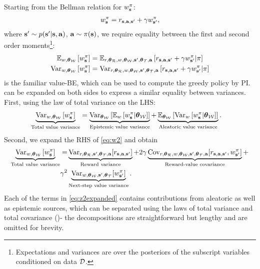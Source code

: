 \documentclass{article}
\begin{document}
\begin{appendices}
Starting from the Bellman relation for $\wb$:
\begin{align*}
\wb = \rsanb + \gamma \wnb,
\end{align*}
where $\bm{s}' \sim p(\ns | \s, \ac)$, $\ac \sim \pi(\s)$, we require equality between the first and second order moments\footnote{Expectations and variances are over the posteriors of the subscript variables conditioned on data $\data$.}:
\begin{align}
\E_{w, \thetamcw} \sqb{\wb} &= \E_{r, \thetamcr, w, \thetamcw, \ns, \thetamct, \ac} \sqb{\rsanb + \gamma \wnb | \pi} \label{eq:w1} \\
\Var_{w, \thetamcw} \sqb{\wb} &= \Var_{r, \thetamcr, w, \thetamcw, \ns, \thetamct, \ac} \sqb{\rsanb + \gamma \wnb | \pi} \label{eq:w2}
\end{align}
 is the familiar value-BE, which can be used to compute the greedy policy by PI.  can be expanded on both sides to express a similar equality between variances. First, using the law of total variance on the LHS:
\begin{align*}
\underbrace{\Var_{w, \thetamcw} \sqb{\wb}}_{\text{Total value variance}} &= \underbrace{\Var_{\thetamcw} \sqb{\E_w\sqb{\wb | \thetamcw}}}_{\text{Epistemic value variance}} + \underbrace{\E_{\thetamcw} \sqb{\Var_w\sqb{\wb | \thetamcw}}}_{\text{Aleatoric value variance}}.
\end{align*}
Second, we expand the RHS of \cref{eq:w2} and obtain
\begin{align}
\underbrace{\Var_{w, \thetamcw} \sqb{\wb}}_{\text{Total value variance}} = &\underbrace{\Var_{r, \thetamcr, \ns, \thetamct, \ac}[\rsanb] }_{\text{Reward variance}} + 2\gamma \underbrace{\Cov_{r, \thetamcr, w, \thetamcw, \ns, \thetamct, \ac}[\rsanb, \wnb]}_{\text{Reward-value covariance}} + \nonumber \\
\gamma^2 &\underbrace{\Var_{w, \thetamcw, \ns, \thetamct}[\wnb]}_{\text{Next-step value variance}}. \label{eq:z2expanded}
\end{align}
Each of the terms in \cref{eq:z2expanded} contains contributions from aleatoric as well as epistemic sources, which can be separated using the laws of total variance and total covariance (\cite{weiss})- the decompositions are straightforward but lengthy and are omitted for brevity.


\end{appendices}
\end{document}
